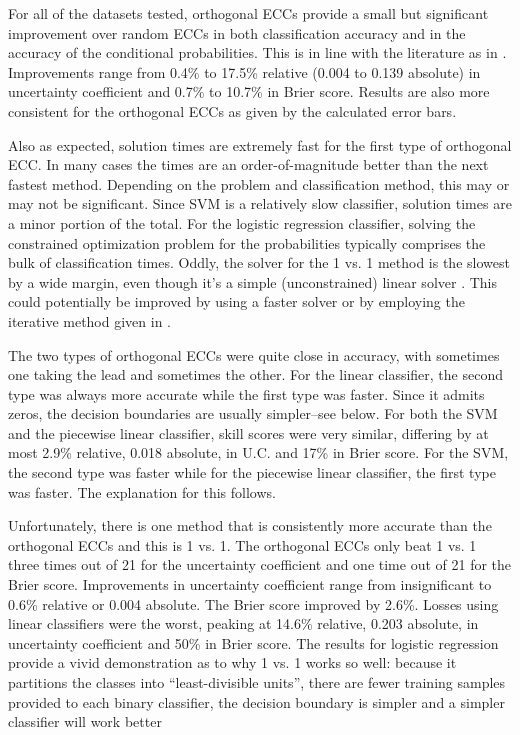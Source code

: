 For all of the datasets tested, orthogonal ECCs provide a small but
significant improvement over random ECCs in both classification
accuracy and in the accuracy of the conditional probabilities.
This is in line with the literature as in \citet{Dietterich_Bakiri1995,Windeatt_Ghaderi2002}.
{\revision
Improvements range from 0.4\% to 17.5\% relative (0.004 to 0.139 absolute) in 
uncertainty coefficient
and 0.7\% to 10.7\% in Brier score.}
Results are also more consistent for the orthogonal ECCs as given by the
calculated error bars.

{\revision
Also as expected, solution times are
extremely fast for the first type of orthogonal ECC.
In many cases the times are an order-of-magnitude better than the next
fastest method.
Depending on the problem and classification method, this may or may not
be significant.
Since SVM is a relatively slow classifier, solution times
are a minor portion of the total.
For the logistic regression classifier,
solving the constrained optimization problem for the probabilities
typically comprises the bulk of classification times.
Oddly, the solver for the 1 vs. 1 method is the slowest by a wide margin,
even though it's a simple (unconstrained) linear solver \citep{Wu_etal2004}.
This could potentially be improved by using a faster solver \citep{Press_etal1992} or by employing
the iterative method given in \citet{Wu_etal2004}.

The two types of orthogonal ECCs were quite close in accuracy,
with sometimes one taking the lead and sometimes the other.
For the linear classifier, the second type was always more accurate while the first
type was faster.
Since it admits zeros, the decision boundaries are usually simpler--see below.
For both the SVM and the piecewise linear classifier, skill scores were very similar,
differing by at most 2.9\% relative, 0.018 absolute, in U.C. and 17\% in Brier score.
For the SVM, the second type was faster while for the piecewise linear classifier,
the first type was faster.
The explanation for this follows.

Unfortunately, there is one method that is consistently more accurate than the
orthogonal ECCs and this is 1 vs. 1.
The orthogonal ECCs only beat 1 vs. 1 three times out of 21 for the
uncertainty coefficient and one time out of 21 for the Brier score.
Improvements in uncertainty coefficient range from insignificant
to 0.6\% relative or 0.004 absolute.
The Brier score improved by 2.6\%.
Losses using linear classifiers were the worst, peaking at 14.6\% relative,
0.203 absolute, in uncertainty coefficient and 50\% in Brier score.
The results for logistic regression provide a vivid demonstration as to
why 1 vs. 1 works so well: because it partitions the classes into
``least-divisible units'', there are fewer training samples provided to
each binary classifier, the decision boundary is simpler and
a simpler classifier will work better

}
